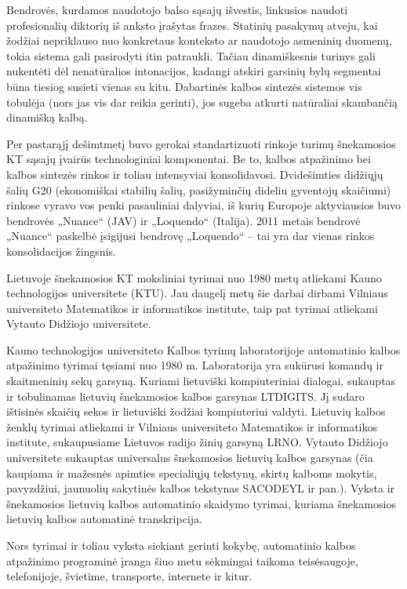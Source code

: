 \begin{multicols}{2}
Bendrovės, kurdamos naudotojo balso sąsajų išvestis, linkusios naudoti profesionalių diktorių iš anksto įrašytas frazes. Statinių pasakymų atveju, kai žodžiai nepriklauso nuo konkretaus konteksto ar naudotojo asmeninių duomenų, tokia sistema gali pasirodyti itin patraukli. Tačiau dinamiškesnis turinys gali nukentėti dėl nenatūralios intonacijos, kadangi atskiri garsinių bylų segmentai būna tiesiog susieti vienas su kitu. Dabartinės kalbos sintezės sistemos vis tobulėja (nors jas vis dar reikia gerinti), jos sugeba atkurti natūraliai skambančią dinamišką kalbą.   

    Per pastarąjį dešimtmetį buvo gerokai standartizuoti rinkoje turimų šnekamosios KT sąsajų įvairūs technologiniai komponentai. Be to, kalbos atpažinimo bei kalbos sintezės rinkos ir toliau intensyviai konsolidavosi. Dvidešimties didžiųjų šalių G20 (ekonomiškai stabilių šalių, pasižyminčių dideliu gyventojų skaičiumi) rinkose vyravo vos penki pasauliniai dalyviai, iš kurių Europoje aktyviausios buvo bendrovės „Nuance“ (JAV) ir „Loquendo“ (Italija). 2011 metais bendrovė „Nuance“ paskelbė įsigijusi bendrovę „Loquendo“ – tai yra dar vienas rinkos konsolidacijos žingsnis.   

    Lietuvoje šnekamosios KT moksliniai tyrimai nuo 1980 metų atliekami Kauno technologijos universitete (KTU). Jau daugelį metų šie darbai dirbami Vilniaus universiteto Matematikos ir informatikos institute, taip pat tyrimai atliekami Vytauto Didžiojo universitete.   

    Kauno technologijos universiteto Kalbos tyrimų laboratorijoje automatinio kalbos atpažinimo tyrimai tęsiami nuo 1980 m. Laboratorija yra sukūrusi komandų ir skaitmeninių sekų garsyną. Kuriami lietuviški kompiuteriniai dialogai, sukauptas ir tobulinamas lietuvių šnekamosios kalbos garsynas LTDIGITS. Jį sudaro ištisinės skaičių sekos ir lietuviški žodžiai kompiuteriui valdyti. Lietuvių kalbos ženklų tyrimai atliekami ir Vilniaus universiteto Matematikos ir informatikos institute, sukaupusiame Lietuvos radijo žinių garsyną LRNO. Vytauto Didžiojo universitete sukauptas universalus šnekamosios lietuvių kalbos garsynas (čia kaupiama ir mažesnės apimties specialiųjų tekstynų, skirtų kalboms mokytis, pavyzdžiui, jaunuolių sakytinės kalbos tekstynas SACODEYL ir pan.). Vyksta ir šnekamosios lietuvių kalbos automatinio skaidymo tyrimai, kuriama šnekamosios lietuvių kalbos automatinė transkripcija.   

    Nors tyrimai ir toliau vyksta siekiant gerinti kokybę, automatinio kalbos atpažinimo programinė įranga šiuo metu sėkmingai taikoma teisėsaugoje, telefonijoje, švietime, transporte, internete ir kitur.   


\end{multicols}

